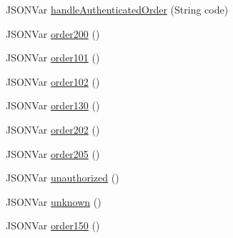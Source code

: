 \begin{DoxyCompactItemize}
\item 
J\+S\+O\+N\+Var \mbox{\hyperlink{class_bollard_controller_class_add52fb47bb3e0e0724f9e815be177ba1}{handle\+Authenticated\+Order}} (String code)
\item 
J\+S\+O\+N\+Var \mbox{\hyperlink{class_bollard_controller_class_ac3d5d0d205c14f92ce259c72f3f6181e}{order200}} ()
\item 
J\+S\+O\+N\+Var \mbox{\hyperlink{class_bollard_controller_class_ac4862bcb5d565875e5330865c9a2af7f}{order101}} ()
\item 
J\+S\+O\+N\+Var \mbox{\hyperlink{class_bollard_controller_class_ad411677305ddacf05e5d26470dfa1253}{order102}} ()
\item 
J\+S\+O\+N\+Var \mbox{\hyperlink{class_bollard_controller_class_a2d88e7925b96e33a9feb1d694af472ff}{order130}} ()
\item 
J\+S\+O\+N\+Var \mbox{\hyperlink{class_bollard_controller_class_ac00390cae67911839fea54cca8fc271b}{order202}} ()
\item 
J\+S\+O\+N\+Var \mbox{\hyperlink{class_bollard_controller_class_a691390c11d2573946b99240d088c647e}{order205}} ()
\item 
J\+S\+O\+N\+Var \mbox{\hyperlink{class_bollard_controller_class_a44b4123649f5bffc436e544c85b0af15}{unauthorized}} ()
\item 
J\+S\+O\+N\+Var \mbox{\hyperlink{class_bollard_controller_class_a5d086d123a1f4130e9d48fb03105796d}{unknown}} ()
\item 
J\+S\+O\+N\+Var \mbox{\hyperlink{class_bollard_controller_class_a837c32c83b06ee43688222a30c6c2986}{order150}} ()
\end{DoxyCompactItemize}
